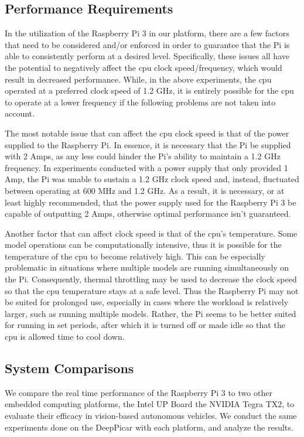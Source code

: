 \subsection{Performance Requirements}
In the utilization of the Raspberry Pi 3 in our platform, there are a few factors that need to be 
considered and/or enforced in order to guarantee that the Pi is able to consistently perform at a 
desired level. Specifically, these issues all have the potential to negatively affect the cpu clock 
speed/frequency, which would result in decreased performance. While, in the above experiments, the cpu 
operated at a preferred clock speed of 1.2 GHz, it is entirely possible for the cpu to operate at a 
lower frequency if the following problems are not taken into account.

The most notable issue that can affect the cpu clock speed is that of the power supplied to the 
Raspberry Pi. In essence, it is necessary that the Pi be supplied with 2 Amps, as any less could 
hinder the Pi's ability to maintain a 1.2 GHz frequency. In experiments conducted with a power supply that 
only provided 1 Amp, the Pi was unable to sustain a 1.2 GHz clock speed and, instead, fluctuated 
between operating at 600 MHz and 1.2 GHz. As a result, it is necessary, or at least highly 
recommended, that the power supply used for the Raspberry Pi 3 be capable of outputting 2 Amps, 
otherwise optimal performance isn't guaranteed.

Another factor that can affect clock speed is that of the cpu's temperature. Some model operations can 
be computationally intensive, thus it is possible for the temperature of the cpu to become relatively 
high. This can be especially problematic in situations where multiple models are running 
simultaneously on the Pi. Consequently, thermal throttling may be used to decrease the clock 
speed so that the cpu temperature stays at a safe level. Thus the Raspberry Pi may not be suited 
for prolonged use, especially in cases where the workload is relatively larger, such as running multiple 
models. Rather, the Pi seems to be better suited for running in set periods, after which it is turned 
off or made idle so that the cpu is allowed time to cool down.

\subsection{System Comparisons}
We compare the real time performance of the Raspberry Pi 3 to two other embedded computing platforms, 
the Intel UP Board the NVIDIA Tegra TX2, to evaluate their efficacy in vision-based autonomous 
vehicles. We conduct the same experiments done on the DeepPicar with each platform, and analyze the 
results.

